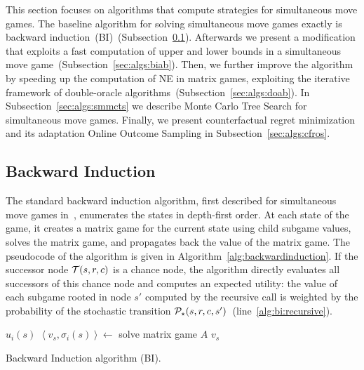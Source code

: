 
This section focuses on algorithms that compute strategies for simultaneous move games.
The baseline algorithm for solving simultaneous move games exactly is backward induction~(BI)~(Subsection~\ref{sec:algs:bi}).
Afterwards we present a modification that exploits a fast computation of upper and lower bounds in a simultaneous move game~(Subsection~\ref{sec:algs:biab}).
Then, we further improve the algorithm by speeding up the computation of NE in matrix games, exploiting the iterative framework of double-oracle algorithms~(Subsection~\ref{sec:algs:doab}).
In Subsection~\ref{sec:algs:smmcts} we describe Monte Carlo Tree Search for simultaneous move games.
Finally, we present counterfactual regret minimization and its adaptation Online Outcome Sampling in Subsection~\ref{sec:algs:cfros}.


\subsection{Backward Induction}\label{sec:algs:bi}

The standard backward induction algorithm, first described for simultaneous move games in~\cite{Ross71Goofspiel}, enumerates the states in depth-first order. At each state of the game, it creates a matrix game for the current state using child subgame values, solves the matrix game, and propagates back the value of the matrix game. The pseudocode of the algorithm is given in Algorithm~\ref{alg:backwardinduction}. If the successor node $\mathcal{T}(s,r,c)$ is a chance node, the algorithm directly evaluates all successors of this chance node and computes an expected utility: the value of each subgame rooted in node $s'$ computed by the recursive call is weighted by the probability of the stochastic transition $\mathcal{P}_\star(s,r,c,s')$~(line~\ref{alg:bi:recursive}).

\begin{algorithm2e}[t]
\small
{}
 {\Return $u_i(s)$} \label{alg:bi:stop1}
$\left\langle v_s, \sigma_i(s) \right\rangle \leftarrow$ solve matrix game $A$\;  \label{alg:bi:solve}
\Return $v_s$ \label{alg:bi:stop2}
\caption{Backward Induction algorithm (BI).}\label{alg:backwardinduction}
\end{algorithm2e}

